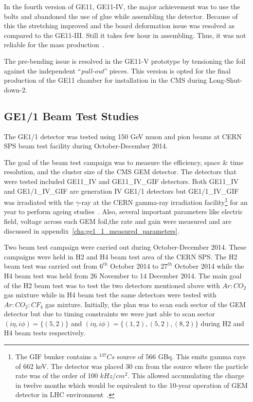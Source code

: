 In the fourth version of GE11, GE11-IV, the major achievement was to use the bolts and abandoned the use of glue while assembling the detector. Because of this the stretching improved and the board deformation issue was resolved as compared to the GE11-III. Still it takes few hour in assembling.
Thus, it was not reliable for the mass production~\cite{Abbaneo2013}. 

The pre-bending issue is resolved in the GE11-V prototype by tensioning the foil against the independent ``\textit{pull-out}'' pieces. This version is opted for the final production of the GE11 chamber for installation in the CMS during Long-Shut-down-2.

\subsection{GE1/1 Beam Test Studies}
The GE1/1 detector was tested using 150 GeV muon and pion beams at CERN SPS beam test facility during October-December 2014. 

The goal of the beam test campaign was to measure the efficiency, space \& time resolution, and the cluster size of the CMS GEM detector. 
The detectors that were tested included GE11\_IV and GE11\_IV\_GIF detectors.
Both GE11\_IV and GE1/1\_IV\_GIF are generation IV GE1/1 detectors but GE1/1\_IV\_GIF was irradiated with the $\gamma$-ray at the CERN gamma-ray irradiation facility\footnote{The GIF bunker contains a $^{137}Cs$ source of 566 GBq. This emits gamma rays of 662 keV. The detector was placed 30 cm from the source where the particle rate was of the order of 100 $kHz/cm^2$. This allowed accumulating the charge in twelve months which would be equivalent to the 10-year operation of GEM detector in LHC environment~\cite{Merlin2013}.} for an year to perform ageing studies~\cite{Merlin2013}. Also, several important parameters like electric field, voltage across each GEM foil,the rate and gain were measured and are discussed in appendix~\ref{cha:ge1_1_measured_parameters}.

Two beam test campaign were carried out during October-December 2014.
These campaigns were held in H2 and H4 beam test area of the CERN SPS.
The H2 beam test was carried out from $6^{th}$ October 2014 to $27^{th}$ October 2014 while the H4 beam test was held from 26 November to 14 December 2014.
The main goal of the H2 beam test was to test the two detectors mentioned above with $Ar:CO_2$ gas mixture while in H4 beam test the same detectors were tested with $Ar:CO_2:CF_4$ gas mixture.
Initially, the plan was to scan each sector of the GEM detector but due to timing constraints we were just able to scan sector $(i\eta, i\phi)=\{(5,2)\}$ and $(i\eta,i\phi)=\{(1,2),(5,2),(8,2)\}$ during H2 and H4 beam tests respectively.  


